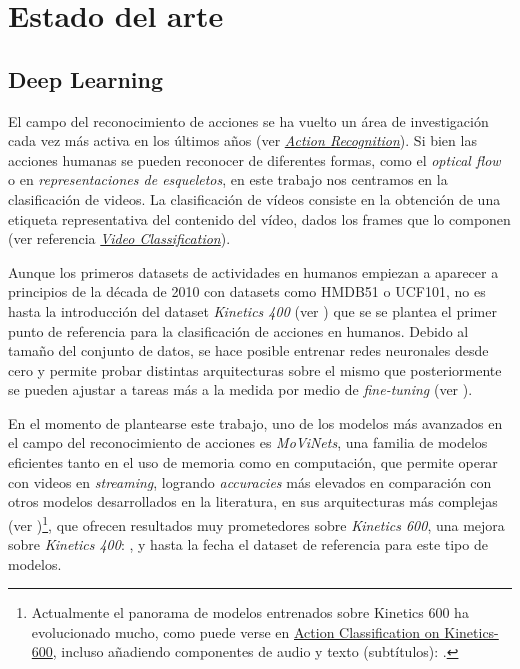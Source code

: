 \chapter{Estado del arte}\label{estado_del_arte}

\section{Deep Learning}

El campo del reconocimiento de acciones se ha vuelto un área de investigación cada vez más activa en los últimos años (ver \href{https://paperswithcode.com/task/action-recognition-in-videos}{\textit{Action Recognition}}). Si bien las acciones humanas se pueden reconocer de diferentes formas, como el \textit{optical flow} o en \textit{representaciones de esqueletos}, en este trabajo nos centramos en la clasificación de videos. La clasificación de vídeos consiste en la obtención de una etiqueta representativa del contenido del vídeo, dados los frames que lo componen (ver referencia \href{https://paperswithcode.com/task/video-classification}{\textit{Video Classification}}).

Aunque los primeros datasets de actividades en humanos empiezan a aparecer a principios de la década de 2010 con datasets como HMDB51 o UCF101, no es hasta la introducción del dataset \textit{Kinetics 400} (ver \cite{Kinetics400}) que se se plantea el primer punto de referencia para la clasificación de acciones en humanos. Debido al tamaño del conjunto de datos, se hace posible entrenar redes neuronales desde cero y permite probar distintas arquitecturas sobre el mismo que posteriormente se pueden ajustar a tareas más a la medida por medio de \textit{fine-tuning} (ver \cite{I3D}).

En el momento de plantearse este trabajo, uno de los modelos más avanzados en el campo del reconocimiento de acciones es \textit{MoViNets}, una familia de modelos eficientes tanto en el uso de memoria como en computación, que permite operar con videos en \textit{streaming}, logrando  \textit{accuracies} más elevados en comparación con otros modelos desarrollados en la literatura, en sus arquitecturas más complejas (ver \cite{MoViNets})\footnote{Actualmente el panorama de modelos entrenados sobre Kinetics 600 ha evolucionado mucho, como puede verse en \href{https://paperswithcode.com/sota/action-classification-on-kinetics-600}{Action Classification on Kinetics-600}, incluso añadiendo componentes de audio y texto (subtítulos): \cite{Merlot}.}, que ofrecen resultados muy prometedores sobre \textit{Kinetics 600}, una mejora sobre \textit{Kinetics 400}: \cite{Kinetics600}, y hasta la fecha el dataset de referencia para este tipo de modelos.

